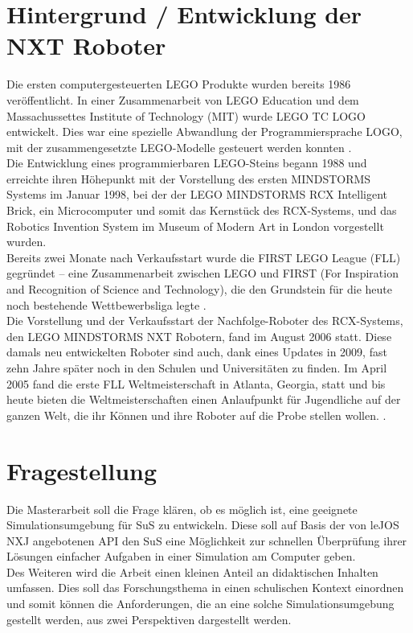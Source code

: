 \documentclass[paper=a4, pagesize, DIV=calc, BCOR=12.5mm, twoside=on, onecolumn=on, open = any, titlepage =on, parskip =half-, headsepline = on, footsepline = on, chapterprefix = on, appendixprefix = off, fontsize = 12pt, numbers = noenddot, abstract = on]{scrbook}
\numberwithin{equation}{chapter}
\begin{document}
\par \singlespacing
\section*{Hintergrund / Entwicklung der NXT Roboter}
\onehalfspacing
Die ersten computergesteuerten LEGO Produkte wurden bereits 1986 veröffentlicht. In einer Zusammenarbeit von LEGO Education und dem Massachussettes Institute of Technology (MIT) wurde LEGO TC LOGO entwickelt. Dies war eine spezielle Abwandlung der Programmiersprache LOGO, mit der zusammengesetzte LEGO-Modelle gesteuert werden konnten \cite{rolling:14}.\\
Die Entwicklung eines programmierbaren LEGO-Steins begann 1988 und erreichte ihren Höhepunkt mit der Vorstellung des ersten MINDSTORMS Systems im Januar 1998, bei der der LEGO MINDSTORMS RCX Intelligent Brick, ein Microcomputer und somit das Kernstück des RCX-Systems, und das Robotics Invention System im Museum of Modern Art in London vorgestellt wurden.\\
Bereits zwei Monate nach Verkaufsstart wurde die FIRST LEGO League (FLL) gegründet -- eine Zusammenarbeit zwischen LEGO und FIRST (For Inspiration and Recognition of Science and Technology), die den Grundstein für die heute noch bestehende Wettbewerbsliga legte \cite{rolling:14}.\\
Die Vorstellung und der Verkaufsstart der Nachfolge-Roboter des RCX-Systems, den LEGO MINDSTORMS NXT Robotern, fand im August 2006 statt. Diese damals neu entwickelten Roboter sind auch, dank eines Updates in 2009, fast zehn Jahre später noch in den Schulen und Universitäten zu finden. Im April 2005 fand die erste FLL Weltmeisterschaft in Atlanta, Georgia, statt und bis heute bieten die Weltmeisterschaften einen Anlaufpunkt für Jugendliche auf der ganzen Welt, die ihr Können und ihre Roboter auf die Probe stellen wollen. \cite{lego}.

\par \singlespacing
\section*{Fragestellung}
\onehalfspacing
Die Masterarbeit soll die Frage klären, ob es möglich ist, eine geeignete Simulationsumgebung für SuS zu entwickeln. Diese soll auf Basis der von leJOS NXJ angebotenen API den SuS eine Möglichkeit zur schnellen Überprüfung ihrer Lösungen einfacher Aufgaben in einer Simulation am Computer geben.\\
Des Weiteren wird die Arbeit einen kleinen Anteil an didaktischen Inhalten umfassen. Dies soll das Forschungsthema in einen schulischen Kontext einordnen und somit können die Anforderungen, die an eine solche Simulationsumgebung gestellt werden, aus zwei Perspektiven dargestellt werden.
\end{document}
